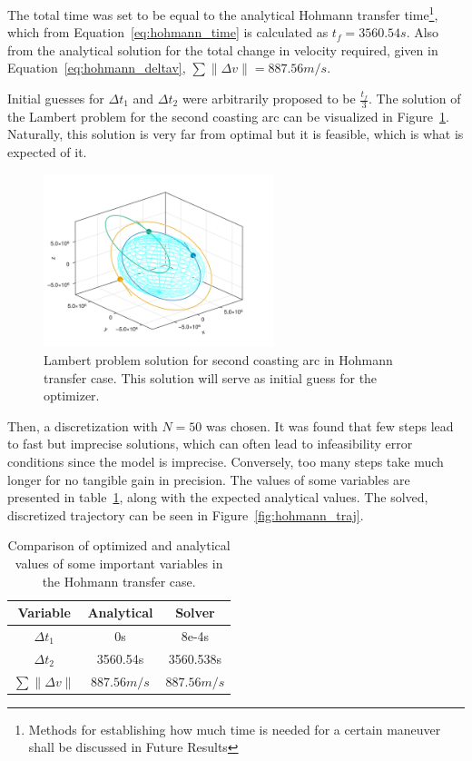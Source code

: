 The total time was set to be equal to the analytical Hohmann transfer time\footnote{Methods for establishing how much time is needed for a certain maneuver shall be discussed in Future Results}, which from Equation~\eqref{eq:hohmann_time} is calculated as \(t_f = 3560.54s\). Also from the analytical solution for the total change in velocity required, given in Equation~\eqref{eq:hohmann_deltav}, \(\sum \lVert \Delta v \rVert = 887.56m/s\).

Initial guesses for \(\Delta t_1\) and \(\Delta t_2\) were arbitrarily proposed to be \(\frac{t_f}{3}\). The solution of the Lambert problem for the second coasting arc can be visualized in Figure~\ref{fig:hohmann_lambert}. Naturally, this solution is very far from optimal but it is feasible, which is what is expected of it.

\begin{figure}[htbp]
    \centering
    \includegraphics[width=0.6\textwidth]{img/hohmann_lambert_guess.png}
    \caption{Lambert problem solution for second coasting arc in Hohmann transfer case. This solution will serve as initial guess for the optimizer.}
    \label{fig:hohmann_lambert}
\end{figure}

Then, a discretization with \(N = 50\) was chosen. It was found that few steps lead to fast but imprecise solutions, which can often lead to infeasibility error conditions since the model is imprecise. Conversely, too many steps take much longer for no tangible gain in precision. The values of some variables are presented in table~\ref{tab:hohmann_results}, along with the expected analytical values. The solved, discretized trajectory can be seen in Figure~\ref{fig:hohmann_traj}.

\begin{table}[htbp]
    \centering
    \begin{tabular}{ccc} \toprule
        Variable & Analytical & Solver \\ \midrule
        \(\Delta t_1\) & 0s & 8e-4s \\
        \(\Delta t_2\) & 3560.54s & 3560.538s \\
        \(\sum \lVert \Delta v \rVert\) & \(887.56m/s\) & \(887.56m/s\) \\ \bottomrule
    \end{tabular}
    \caption{Comparison of optimized and analytical values of some important variables in the Hohmann transfer case.}
    \label{tab:hohmann_results}
\end{table}

